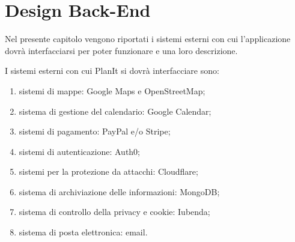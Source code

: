 \section{Design Back-End}
\label{secD1:RequisitiBackEnd}

Nel presente capitolo vengono riportati i sistemi esterni con cui l'applicazione dovrà interfacciarsi per poter funzionare e una loro descrizione.

I sistemi esterni con cui PlanIt si dovrà interfacciare sono:
\begin{enumerate}
    \item sistemi di mappe: Google Maps e OpenStreetMap;
    \item sistema di gestione del calendario: Google Calendar;
    \item sistemi di pagamento: PayPal e/o Stripe;
    \item sistemi di autenticazione: Auth0;
    \item sistemi per la protezione da attacchi: Cloudflare;
    \item sistema di archiviazione delle informazioni: MongoDB;
    \item sistema di controllo della privacy e cookie: Iubenda;
    \item sistema di posta elettronica: email.
\end{enumerate}


